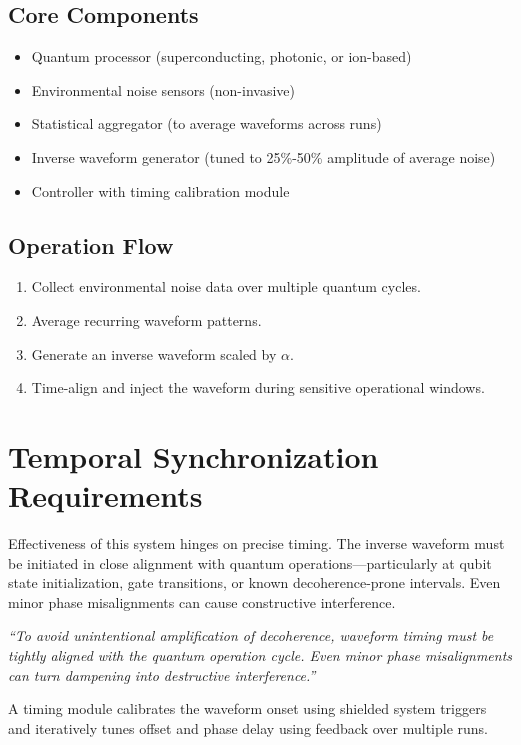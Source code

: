 \documentclass[12pt]{article}
\begin{document}
\subsection*{Core Components}
\begin{itemize}
  \item Quantum processor (superconducting, photonic, or ion-based)
  \item Environmental noise sensors (non-invasive)
  \item Statistical aggregator (to average waveforms across runs)
  \item Inverse waveform generator (tuned to 25\%-50\% amplitude of average noise)
  \item Controller with timing calibration module
\end{itemize}

\subsection*{Operation Flow}
\begin{enumerate}
  \item Collect environmental noise data over multiple quantum cycles.
  \item Average recurring waveform patterns.
  \item Generate an inverse waveform scaled by $\alpha$.
  \item Time-align and inject the waveform during sensitive operational windows.
\end{enumerate}

\section*{Temporal Synchronization Requirements}
Effectiveness of this system hinges on precise timing. The inverse waveform must be initiated in close alignment with quantum operations---particularly at qubit state initialization, gate transitions, or known decoherence-prone intervals. Even minor phase misalignments can cause constructive interference.

\medskip
\noindent
\textit{“To avoid unintentional amplification of decoherence, waveform timing must be tightly aligned with the quantum operation cycle. Even minor phase misalignments can turn dampening into destructive interference.”}

\medskip
A timing module calibrates the waveform onset using shielded system triggers and iteratively tunes offset and phase delay using feedback over multiple runs.
\end{document}
